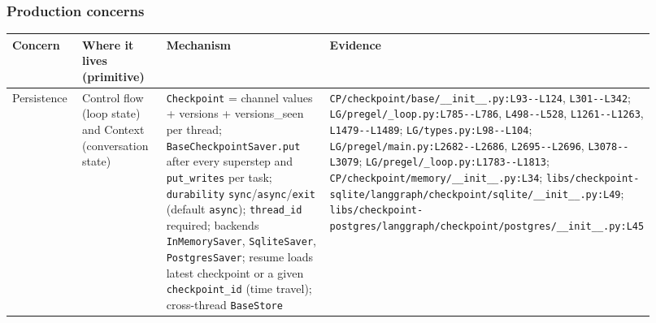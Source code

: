 \subsubsection*{Production concerns}
\begin{longtable}{@{}p{0.13\linewidth}p{0.17\linewidth}p{0.36\linewidth}p{0.26\linewidth}@{}}
\toprule \textbf{Concern} & \textbf{Where it lives (primitive)} & \textbf{Mechanism} & \textbf{Evidence} \\ \midrule \endhead
Persistence & Control flow (loop state) and Context (conversation state) & \texttt{Checkpoint} = channel values + versions + versions\_seen per thread; \texttt{BaseCheckpointSaver.\allowbreak{}put} after every superstep and \texttt{put\_\allowbreak{}writes} per task; \texttt{durability} \texttt{sync}/\texttt{async}/\texttt{exit} (default \texttt{async}); \texttt{thread\_\allowbreak{}id} required; backends \texttt{InMemorySaver}, \texttt{SqliteSaver}, \texttt{PostgresSaver}; resume loads latest checkpoint or a given \texttt{checkpoint\_\allowbreak{}id} (time travel); cross-thread \texttt{BaseStore} & \texttt{CP/\allowbreak{}checkpoint/\allowbreak{}base/\allowbreak{}\_\allowbreak{}\_\allowbreak{}init\_\allowbreak{}\_\allowbreak{}.\allowbreak{}py:\allowbreak{}L93-\allowbreak{}-\allowbreak{}L124}, \texttt{L301-\allowbreak{}-\allowbreak{}L342}; \texttt{LG/\allowbreak{}pregel/\allowbreak{}\_\allowbreak{}loop.\allowbreak{}py:\allowbreak{}L785-\allowbreak{}-\allowbreak{}L786}, \texttt{L498-\allowbreak{}-\allowbreak{}L528}, \texttt{L1261-\allowbreak{}-\allowbreak{}L1263}, \texttt{L1479-\allowbreak{}-\allowbreak{}L1489}; \texttt{LG/\allowbreak{}types.\allowbreak{}py:\allowbreak{}L98-\allowbreak{}-\allowbreak{}L104}; \texttt{LG/\allowbreak{}pregel/\allowbreak{}main.\allowbreak{}py:\allowbreak{}L2682-\allowbreak{}-\allowbreak{}L2686}, \texttt{L2695-\allowbreak{}-\allowbreak{}L2696}, \texttt{L3078-\allowbreak{}-\allowbreak{}L3079}; \texttt{LG/\allowbreak{}pregel/\allowbreak{}\_\allowbreak{}loop.\allowbreak{}py:\allowbreak{}L1783-\allowbreak{}-\allowbreak{}L1813}; \texttt{CP/\allowbreak{}checkpoint/\allowbreak{}memory/\allowbreak{}\_\allowbreak{}\_\allowbreak{}init\_\allowbreak{}\_\allowbreak{}.\allowbreak{}py:\allowbreak{}L34}; \texttt{libs/\allowbreak{}checkpoint-\allowbreak{}sqlite/\allowbreak{}langgraph/\allowbreak{}checkpoint/\allowbreak{}sqlite/\allowbreak{}\_\allowbreak{}\_\allowbreak{}init\_\allowbreak{}\_\allowbreak{}.\allowbreak{}py:\allowbreak{}L49}; \texttt{libs/\allowbreak{}checkpoint-\allowbreak{}postgres/\allowbreak{}langgraph/\allowbreak{}checkpoint/\allowbreak{}postgres/\allowbreak{}\_\allowbreak{}\_\allowbreak{}init\_\allowbreak{}\_\allowbreak{}.\allowbreak{}py:\allowbreak{}L45} \\

\end{longtable}
